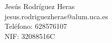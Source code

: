 Jesús Rodríguez Heras \\ %
jesus.rodriguezheras@alum.uca.es \\ %
Teléfono: 628576107 \\ %
NIF: 32088516C \\ %
